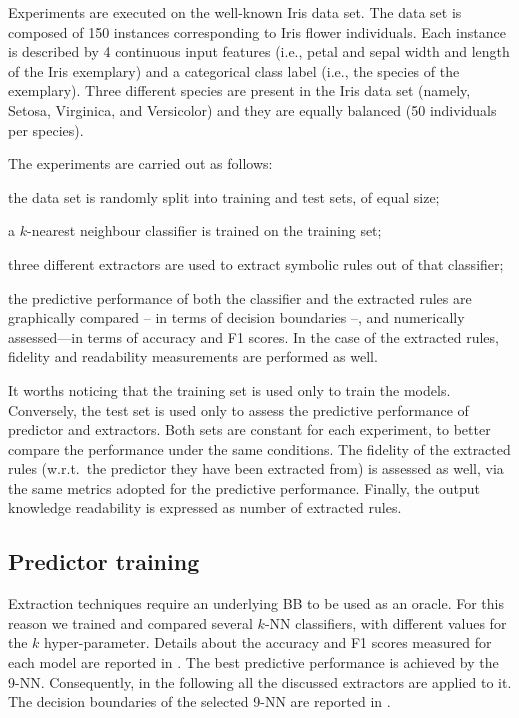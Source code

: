 \documentclass[
]{ceurart}
\begin{document}
Experiments are executed on the well-known Iris data set\footnotemark.
%
%
The data set is composed of 150 instances corresponding to Iris flower individuals.
%
Each instance is described by 4 continuous input features (i.e., petal and sepal width and length of the Iris exemplary) and a categorical class label (i.e., the species of the exemplary).
%
Three different species are present in the Iris data set (namely, Setosa, Virginica, and Versicolor) and they are equally balanced (50 individuals per species).

The experiments are carried out as follows:
%
\begin{inlinelist}
	\item the data set is randomly split into training and test sets, of equal size;
	\item a $k$-nearest neighbour classifier is trained on the training set;
	\item three different extractors are used to extract symbolic rules out of that classifier;
	\item the predictive performance of both the classifier and the extracted rules are graphically compared -- in terms of decision boundaries --, and numerically assessed---in terms of accuracy and F1 scores. In the case of the extracted rules, fidelity and readability measurements are performed as well.
\end{inlinelist}
%
It worths noticing that the training set is used only to train the models.
%
Conversely, the test set is used only to assess the predictive performance of predictor and extractors.
%
Both sets are constant for each experiment, to better compare the performance under the same conditions.
%
The fidelity of the extracted rules (w.r.t.\ the predictor they have been extracted from) is assessed as well, via the same metrics adopted for the predictive performance.
%
Finally, the output knowledge readability is expressed as number of extracted rules.

\subsection{Predictor training}



Extraction techniques require an underlying BB to be used as an oracle.
%
For this reason we trained and compared several $k$-NN classifiers, with different values for the $k$ hyper-parameter.
%
Details about the accuracy and F1 scores measured for each model are reported in .
%
The best predictive performance is achieved by the 9-NN.
%
Consequently, in the following all the discussed extractors are applied to it.
%
The decision boundaries of the selected 9-NN are reported in .
\end{document}
